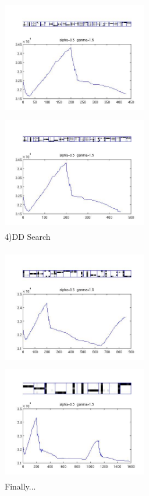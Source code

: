 \documentclass{article}
\begin{document}
\begin{spacing}{1.1}
\begin{figure}[h]
\begin{minipage}[b]{0.5\textwidth}
    \centering 
    \includegraphics[width=2.5in,height=2in]{200_initrd_r1.jpg} 
    \caption{3)DR Search}
    \label{fig:by:table} 
  \end{minipage}%
  \begin{minipage}[b]{0.5\textwidth} 
    \centering 
    \includegraphics[width=2.5in,height=2in]{200_initrd_r1_d1.jpg} 
    \caption{4)DD Search}
    \label{fig:by:table}  
   \end{minipage}%
\end{figure}
\begin{figure}[h] 
  \begin{minipage}[b]{0.5\textwidth} 
    \centering 
    \includegraphics[width=2.5in,height=2in]{200_initrd_r1_d1_r1_rr.jpg} 
    \caption{1)DR Initialization}
    \label{fig:by:table} 
  \end{minipage}%
  \begin{minipage}[b]{0.5\textwidth} 
    \centering 
    \includegraphics[width=2.5in,height=2in]{200_initrd_r1_d1_r1_rr_ddd.jpg} 
    \caption{Finally...}
    \label{fig:by:table}  
   \end{minipage}%
\end{figure}


\end{spacing}
\end{document}
